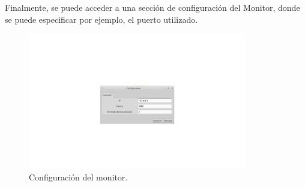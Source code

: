 \documentclass{article}
\begin{document}
	Finalmente, se puede acceder a una sección de configuración del Monitor, donde se puede especificar por ejemplo, el puerto utilizado.
	\begin{figure}[h]
       \centering
       \includegraphics[width=0.85\textwidth]{configuracionMonitor.png}
	\bigskip
       \caption{Configuración del monitor.}
	\end{figure}
\end{document}
